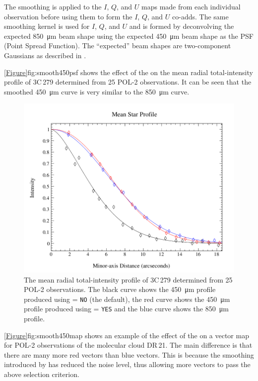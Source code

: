 The smoothing is applied to the $I$, $Q$, and $U$ maps made from each
individual observation before using them to form the $I$, $Q$, and $U$ co-adds. The
same smoothing kernel is used for $I$, $Q$, and $U$ and is formed by deconvolving the
expected \SI{850}{\micro\metre} beam shape using the expected
\SI{450}{\micro\metre} beam shape as the PSF (Point Spread Function). The
``expected'' beam shapes are two-component Gaussians as described in
\cite{dempsey12}.

\cref{Figure}{fig:smooth450psf}{} shows the effect of the  on
the mean radial total-intensity profile of 3C\,279 determined from 25 POL-2
observations. It can be seen that the smoothed \SI{450}{\micro\metre} curve is
very similar to the \SI{850}{\micro\metre} curve.

\begin{figure}[ht!]
\begin{center}
\includegraphics[width=0.9\linewidth]{sc22-smooth450-psf-1.png}
\caption [PSF plot showing the effect of the \poltwomap\  parameter.]{
  The mean radial total-intensity profile of 3C\,279 determined from 25 POL-2 observations.
  The black curve shows the \SI{450}{\micro\metre} profile produced using
   = \texttt{NO} (the default), the red curve shows the \SI{450}{\micro\metre}
  profile produced using  = \texttt{YES} and the blue curve shows the
  \SI{850}{\micro\metre} profile.
\label{fig:smooth450psf}
}
\end{center}
\end{figure}

\cref{Figure}{fig:smooth450map}{} shows an example of the effect of the
 on a vector map for POL-2 observations of the molecular
cloud DR\,21. The main difference is that there are many more red vectors than
blue vectors. This is because the smoothing introduced by 
has reduced the noise level, thus allowing more vectors to pass the above
selection criterion.


